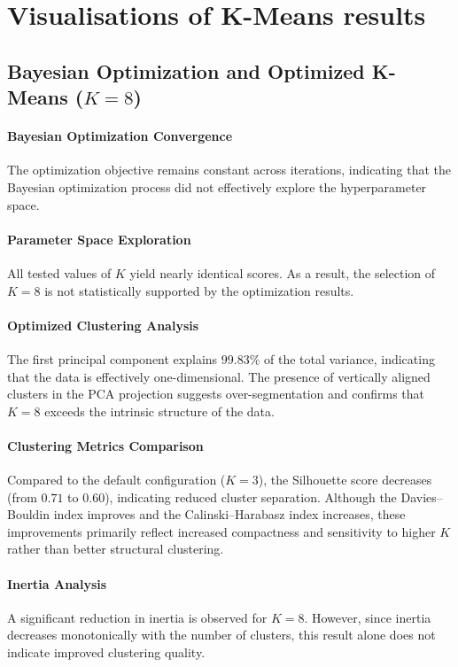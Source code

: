\section{Visualisations of  K-Means results}
\label{annexe:kmeans_visualizations}

\subsection{Bayesian Optimization and Optimized K-Means ($K=8$)}

\paragraph{Bayesian Optimization Convergence}
The optimization objective remains constant across iterations, indicating that the Bayesian optimization process did not effectively explore the hyperparameter space.

\paragraph{Parameter Space Exploration}
All tested values of $K$ yield nearly identical scores. As a result, the selection of $K=8$ is not statistically supported by the optimization results.

\paragraph{Optimized Clustering Analysis}
The first principal component explains $99.83\%$ of the total variance, indicating that the data is effectively one-dimensional. The presence of vertically aligned clusters in the PCA projection suggests over-segmentation and confirms that $K=8$ exceeds the intrinsic structure of the data.

\paragraph{Clustering Metrics Comparison}
Compared to the default configuration ($K=3$), the Silhouette score decreases (from $0.71$ to $0.60$), indicating reduced cluster separation. Although the Davies--Bouldin index improves and the Calinski--Harabasz index increases, these improvements primarily reflect increased compactness and sensitivity to higher $K$ rather than better structural clustering.

\paragraph{Inertia Analysis}
A significant reduction in inertia is observed for $K=8$. However, since inertia decreases monotonically with the number of clusters, this result alone does not indicate improved clustering quality.

